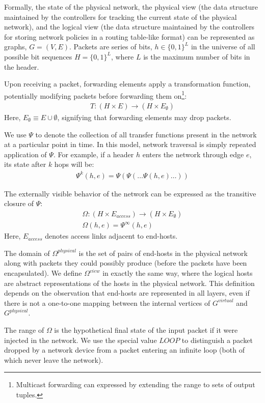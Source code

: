 Formally, the state of the physical network, the physical view (the
data structure maintained by the controllers for tracking the current state of the physical
network), and the
logical view (the data structure maintained by the controllers for storing
network policies in a routing table-like format) can be represented as graphs,
$G = (V, E)$. Packets are series of bits, $h \in \{0,1\}^L$ in the universe
of all possible bit sequences $H = \{0,1\}^L$,
where $L$ is the maximum number of bits in the header.

Upon receiving a packet,
forwarding elements apply a transformation function, potentially modifying
packets before forwarding them on\footnote{Multicast forwarding can expressed
by extending the range to sets of output tuples.}:
\begin{align*}
T: (H \times E) \rightarrow (H \times E_{\emptyset})
\end{align*}
Here, $E_{\emptyset} \equiv E \cup \emptyset$, signifying that forwarding elements
may drop packets.

We use $\Psi$ to denote the collection of all transfer functions present in
the network at a particular point in time. In this model, network traversal is
simply repeated application of $\Psi$.
For example, if a header $h$ enters the network through edge
$e$, its state after $k$ hops will be:
\begin{align*}
\Psi^k(h,e) = \Psi(\Psi(\dots \Psi(h,e)\dots))
\end{align*}

The externally visible behavior of the network can be expressed as the
transitive closure of $\Psi$:
\begin{align*}
\Omega: (H \times E_{access}) \rightarrow (H \times E_{\emptyset}) \\
\Omega(h,e) = \Psi^{\infty}(h,e)
\end{align*}
Here, $E_{access}$ denotes access links adjacent to end-hosts.

The domain of $\Omega^{physical}$ is the set of pairs of end-hosts in the
physical network along with packets they could possibly produce (before
the packets have been encapsulated). We define $\Omega^{view}$ in exactly the same way, where
the logical hosts are abstract representations of the hosts in the physical
network. This definition depends on the observation that end-hosts are represented
in all layers, even if there is not a one-to-one mapping between the
internal vertices of $G^{virtual}$ and $G^{physical}$.

The range of $\Omega$ is the hypothetical final state of the
input packet if it were injected in the network.
We use the special value $LOOP$ to distinguish
a packet dropped by a network device from a packet entering an
infinite loop (both of which never leave the network).

